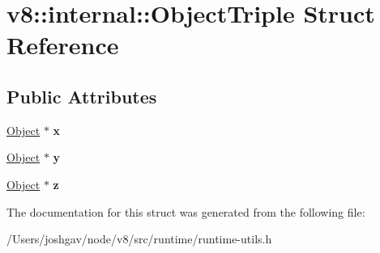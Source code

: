 \hypertarget{structv8_1_1internal_1_1_object_triple}{}\section{v8\+:\+:internal\+:\+:Object\+Triple Struct Reference}
\label{structv8_1_1internal_1_1_object_triple}
\subsection*{Public Attributes}
\begin{DoxyCompactItemize}
\item 
\hyperlink{classv8_1_1internal_1_1_object}{Object} $\ast$ {\bfseries x}\hypertarget{structv8_1_1internal_1_1_object_triple_a09c678d638aa8aa81cf633fc739f6213}{}\label{structv8_1_1internal_1_1_object_triple_a09c678d638aa8aa81cf633fc739f6213}

\item 
\hyperlink{classv8_1_1internal_1_1_object}{Object} $\ast$ {\bfseries y}\hypertarget{structv8_1_1internal_1_1_object_triple_a2820834c50af48eba451f23b1fd682a3}{}\label{structv8_1_1internal_1_1_object_triple_a2820834c50af48eba451f23b1fd682a3}

\item 
\hyperlink{classv8_1_1internal_1_1_object}{Object} $\ast$ {\bfseries z}\hypertarget{structv8_1_1internal_1_1_object_triple_a6cb7796efde1c73f04af671c29afdb52}{}\label{structv8_1_1internal_1_1_object_triple_a6cb7796efde1c73f04af671c29afdb52}

\end{DoxyCompactItemize}


The documentation for this struct was generated from the following file\+:\begin{DoxyCompactItemize}
\item 
/\+Users/joshgav/node/v8/src/runtime/runtime-\/utils.\+h\end{DoxyCompactItemize}

